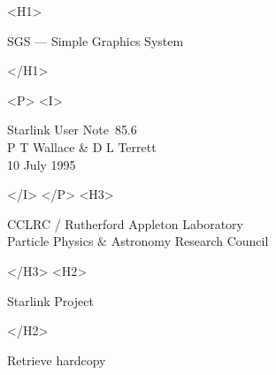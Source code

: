 \documentclass[11pt]{article}
\newcommand{\stardoccategory}  {Starlink User Note}
\newcommand{\stardocsource}    {sun85.6}
\newcommand{\stardocnumber}    {85.6}
\newcommand{\stardocauthors}   {P T Wallace \& D L Terrett}
\newcommand{\stardocdate}      {10 July 1995}
\newcommand{\stardoctitle}     {SGS --- Simple Graphics System}
\newcommand{\htmladdnormallink}[2]{#1}
\newcommand{\htmladdimg}[1]{}
\newcommand{\xlabel}[1]{}
\begin{document}
\begin{htmlonly}
   \xlabel{}
   \begin{rawhtml} <H1> \end{rawhtml}
      \stardoctitle
   \begin{rawhtml} </H1> \end{rawhtml}


   \begin{rawhtml} <P> <I> \end{rawhtml}
   \stardoccategory\ \stardocnumber \\
   \stardocauthors \\
   \stardocdate
   \begin{rawhtml} </I> </P> <H3> \end{rawhtml}
      \htmladdnormallink{CCLRC}{http://www.clrc.ac.uk} /
      \htmladdnormallink{Rutherford Appleton Laboratory}
                        {http://www.clrc.ac.uk/ral} \\
      Particle Physics \& Astronomy Research Council \\
   \begin{rawhtml} </H3> <H2> \end{rawhtml}
      \htmladdnormallink{Starlink Project}{http://star-www.rl.ac.uk/}
   \begin{rawhtml} </H2> \end{rawhtml}
   \htmladdnormallink{\htmladdimg{source.gif} Retrieve hardcopy}
      {http://star-www.rl.ac.uk/cgi-bin/hcserver?\stardocsource}\\


\end{htmlonly}
\end{document}
